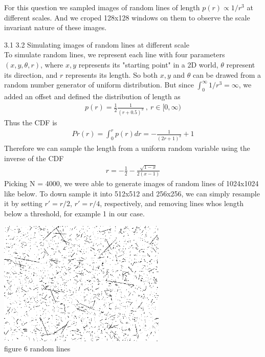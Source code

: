 \documentclass[12pt]{article}
\newenvironment{problem}[2][Problem]{\begin{trivlist}
\item[\hskip \labelsep {\bfseries #1}\hskip \labelsep {\bfseries #2}]}{\end{trivlist}}
\begin{document}
\begin{problem}{3. A 2D Scale Invariant World}
\item{}
For this question we sampled images of random lines of length $p(r) \propto 1/r^3$ at different scales. And we croped 128x128 windows on them to observe the scale invariant nature of these images.\\
\item{3.1 3.2 Simulating images of random lines at different scale\\}
To simulate random lines, we represent each line with four parameters $(x, y, \theta, r)$, where $x, y$ represents its "starting point" in a 2D world, $\theta$ represent its direction, and $r$ represents its length. So both $x, y$ and $\theta$ can be drawed from a random number generator of uniform distribution. But since $\int_{0}^{\infty} 1/r^3 = \infty$, we added an offset and defined the distribution of length as
\begin{align*}
	p(r) = \frac{1}{2}\frac{1}{(r+0.5)^3} \ ,\ r \in [0, \infty)
\end{align*}
Thus the CDF is
\begin{align*}
	Pr(r) = \int_{0}^{r} p(r)dr = -\frac{1}{(2r+1)^2} + 1
\end{align*}
Therefore we can sample the length from a uniform random variable using the inverse of the CDF
\begin{align*}
	r = -\frac{1}{2} - \frac{\sqrt{1-x}}{2(x-1)}
\end{align*}
Picking N = 4000, we were able to generate images of random lines of 1024x1024 like below. To down sample it into 512x512 and 256x256, we can simply resample it by setting $r' = r/2$, $r' = r/4$, respectively, and removing lines whos length below a threshold, for example 1 in our case.\\
\begin{center}
		\includegraphics[width=8cm]{results/rand_lines.png}{\\figure 6 random lines}

\end{center}
\end{problem}
\end{document}
